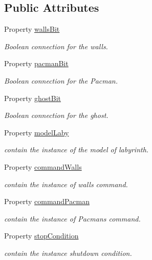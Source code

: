 \subsection*{Public Attributes}
\begin{DoxyCompactItemize}
\item 
Property \hyperlink{class_wrapper_a94dd71be012b98d496117309a20939b1}{walls\+Bit}
\begin{DoxyCompactList}\small\item\em Boolean connection for the walls. \end{DoxyCompactList}\item 
Property \hyperlink{class_wrapper_abf190bfcb1e7ec7573c4e002d30cb125}{pacman\+Bit}
\begin{DoxyCompactList}\small\item\em Boolean connection for the Pacman. \end{DoxyCompactList}\item 
Property \hyperlink{class_wrapper_ab08dd387d1dc363570e576d44a647def}{ghost\+Bit}
\begin{DoxyCompactList}\small\item\em Boolean connection for the ghost. \end{DoxyCompactList}\item 
Property \hyperlink{class_wrapper_a65b2390d6d3e36b42ee0ea886a562d5c}{model\+Laby}
\begin{DoxyCompactList}\small\item\em contain the instance of the model of labyrinth. \end{DoxyCompactList}\item 
Property \hyperlink{class_wrapper_ae0183c9714a832124ccb420d5f9d3c1f}{command\+Walls}
\begin{DoxyCompactList}\small\item\em contain the instance of wall\textquotesingle{}s command. \end{DoxyCompactList}\item 
Property \hyperlink{class_wrapper_ab39f6156efa48a09b1d92e22eb9fc94a}{command\+Pacman}
\begin{DoxyCompactList}\small\item\em contain the instance of Pacman\textquotesingle{}s command. \end{DoxyCompactList}\item 
Property \hyperlink{class_wrapper_a19a246dc459b20945f02106d6734fa4b}{stop\+Condition}
\begin{DoxyCompactList}\small\item\em contain the instance shutdown condition. \end{DoxyCompactList}\item 

\end{DoxyCompactItemize}
